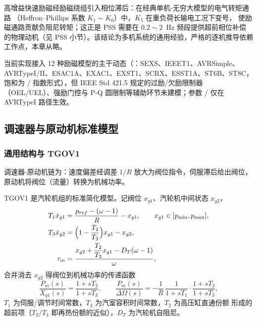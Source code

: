 \begin{remark}[励磁与负阻尼的机理]
高增益快速励磁经励磁绕组引入相位滞后：在经典单机-无穷大模型的电气转矩通路
（Heffron--Phillips 系数 $K_1\sim K_6$）中，$K_5$ 在重负荷长输电工况下变号，
使励磁通路贡献负阻尼转矩；这正是 PSS 需要在 $0.2\sim2$~Hz 频段提供超前相位补偿
的物理动机（见 PSS 小节）。该结论为多机系统的通用经验，严格的逐机推导依赖
工作点，本章从略。
\end{remark}

\begin{gapnote}
当前实现接入 12 种励磁模型的主干动态（：SEXS、IEEET1、AVRSimple、
AVRTypeI/II、ESAC1A、EXAC1、EXST1、SCRX、ESST1A、ST6B、ST8C，饱和为
/ 指数形式），但 IEEE Std 421.5 规定的过励/欠励限制器
（OEL/UEL）、强励门控与 P-Q 圆限制等辅助环节未建模；参数 /
仅在 AVRTypeI 路径生效。
\end{gapnote}

\subsection{调速器与原动机标准模型}\label{sec:dy-th-ctl-gov}

\subsubsection{通用结构与 TGOV1}

调速器-原动机链为：速度偏差经调差 $1/R$ 放大为阀位指令，伺服滞后给出阀位，
原动机将阀位（流量）转换为机械功率。

\begin{definition}[TGOV1]\label{sec:dy-th-ctl-def-tgov1}
TGOV1 是汽轮机组的标准简化模型。记阀位 $x_{g1}$、汽轮机中间状态 $x_{g2}$，
\begin{align}
T_1\dot x_{g1} &= \frac{p_{ref}-(\omega-1)}{R}-x_{g1},
\qquad x_{g1}\in[p_{\min},p_{\max}],\\
T_3\dot x_{g2} &= \Bigl(1-\frac{T_2}{T_3}\Bigr)x_{g1}-x_{g2},\\
\tau_m &= \frac{x_{g2}+\dfrac{T_2}{T_3}x_{g1}-D_T(\omega-1)}{\omega},
\label{sec:dy-th-ctl-eq-tgov1}
\end{align}
合并消去 $x_{g2}$ 得阀位到机械功率的传递函数
\begin{equation}
\frac{P_m(s)}{X_{g1}(s)}=\frac{1+sT_2}{1+sT_3},
\qquad
\frac{P_m(s)}{\Delta\Omega(s)}=-\frac{1}{R}\,
\frac{1}{1+sT_1}\cdot\frac{1+sT_2}{1+sT_3},
\label{sec:dy-th-ctl-eq-tgov1tf}
\end{equation}
$T_1$ 为伺服/调节时间常数，$T_3$ 为汽室容积时间常数，$T_2$ 为高压缸直通份额
形成的超前项（$T_2/T_3$ 即再热份额的近似），$D_T$ 为汽轮机自阻尼。
\end{definition}

